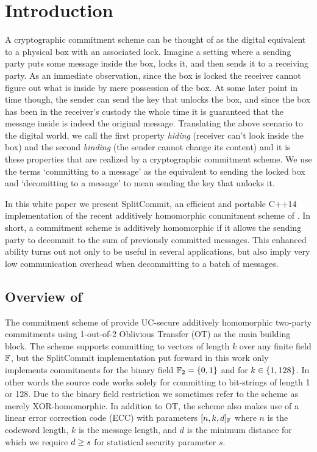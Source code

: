 
\section{Introduction}

A cryptographic commitment scheme can be thought of as the digital equivalent to a  physical box with an associated lock. Imagine a setting where a sending party puts some message inside the box, locks it, and then sends it to a receiving party. As an immediate observation, since the box is locked the receiver cannot figure out what is inside by mere possession of the box. At some later point in time though, the sender can send the key that unlocks the box, and since the box has been in the receiver's custody the whole time it is guaranteed that the message inside is indeed the original message. Translating the above scenario to the digital world, we call the first property \textit{hiding} (receiver can't look inside the box) and the second \textit{binding} (the sender cannot change its content) and it is these properties that are realized by a cryptographic commitment scheme. We use the terms `committing to a message' as the equivalent to sending the locked box and `decomitting to a message' to mean sending the key that unlocks it.

In this white paper we present SplitCommit, an efficient and portable C++14 implementation of the recent additively homomorphic commitment scheme of \cite{DBLP:conf/tcc/FrederiksenJNT16}. In short, a commitment scheme is additively homomorphic if it allows the sending party to decommit to the sum of previously committed messages. This enhanced ability turns out not only to be useful in several applications, but also imply very low communication overhead when decommitting to a batch of messages.

\subsection{Overview of \cite{DBLP:conf/tcc/FrederiksenJNT16}}
The commitment scheme of \cite{DBLP:conf/tcc/FrederiksenJNT16} provide UC-secure additively homomorphic two-party commitments using 1-out-of-2 Oblivious Transfer (OT) as the main building block. The scheme supports committing to vectors of length $k$ over any finite field $\mathbb{F}$, but the SplitCommit implementation put forward in this work only implements commitments for the binary field $\mathbb{F}_2 = \left\{ 0,1 \right\}$ and for $k \in \left\{ 1,128 \right\}$. In other words the source code works solely for committing to bit-strings of length 1 or 128. Due to the binary field restriction we sometimes refer to the scheme as merely XOR-homomorphic. In addition to OT, the scheme also makes use of a linear error correction code (ECC) with parameters $[n,k,d]_{\mathbb{F}}$ where $n$ is the codeword length, $k$ is the message length, and $d$ is the minimum distance for which we require $d \geq s$ for statistical security parameter $s$.

